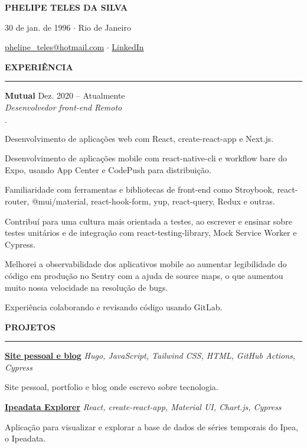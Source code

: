 \documentclass[11pt,letterpaper]{article}
\newenvironment{tightlist}
  {\begin{list}
    {$\cdot$}
    {
      \setlength{\leftmargin}{0em}
      \setlength{\itemsep}{-\smallskipamount}
    }
  }
{\end{list}}
\begin{document}
\pagestyle{empty}

\centerline{\huge\bf PHELIPE TELES DA SILVA}
\medskip

\centerline{30 de jan. de 1996 $\cdot$ Rio de Janeiro}
\smallskip

\centerline{
  \href{mailto:phelipe_teles@hotmail.com}{phelipe\_teles@hotmail.com}
  $\cdot$
  \href{https://linkedin.com/in/phelipeteles}{LinkedIn}
}
\smallskip

\medskip \textbf{EXPERIÊNCIA} \medskip
\hrule

\textbf{Mutual} \hfill Dez. 2020 -- Atualmente \\
\emph{Desenvolvedor front-end} \hfill \emph{Remoto} {\parfillskip=0pt\par}

\begin{tightlist}
  \item Desenvolvimento de aplicações web com React, create-react-app e Next.js.
  \item Desenvolvimento de aplicações mobile com react-native-cli e workflow bare do
    Expo, usando App Center e CodePush para distribuição.
  \item Familiaridade com ferramentas e bibliotecas de front-end como
    Stroybook, react-router, @mui/material, react-hook-form, yup,
    react-query, Redux e outras.
  \item Contribuí para uma cultura mais orientada a testes, ao escrever e
    ensinar sobre testes unitários e de integração com
    react-testing-library, Mock Service Worker e Cypress.
  \item Melhorei a observabilidade dos aplicativos mobile ao aumentar
    legibilidade do código em produção no Sentry com a ajuda de source
    maps, o que aumentou muito nossa velocidade na resolução de bugs.
  \item Experiência colaborando e revisando código usando GitLab.
\end{tightlist}

\medskip \textbf{PROJETOS} \medskip
\hrule

\textbf{\href{https://phelipetls.github.io}{Site pessoal e blog}} \hfill \emph{Hugo, JavaScript, Tailwind CSS, HTML, GitHub Actions, Cypress}
{\parfillskip=0pt\par}
Site pessoal, portfolio e blog onde escrevo sobre tecnologia.

\smallskip

\textbf{\href{http://ipeadata-explorer.surge.sh}{Ipeadata Explorer}} \hfill \emph{React, create-react-app, Material UI, Chart.js, Cypress}
{\parfillskip=0pt\par}
Aplicação para visualizar e explorar a base de dados de séries temporais do Ipea, o Ipeadata.
\end{document}
